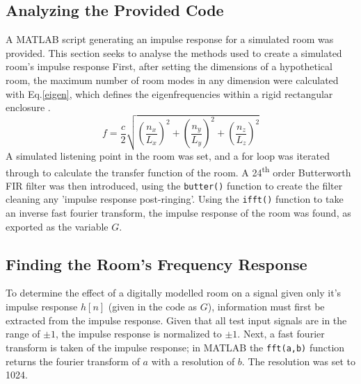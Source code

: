 \documentclass[conference]{IEEEtran}
\def\code#1{\texttt{#1}}
\begin{document}
    \subsection{Analyzing the Provided Code}
        A MATLAB script generating an impulse response for a simulated room was provided.
        This section seeks to analyse the methods used to create a simulated room's impulse response
        First, after setting the dimensions of a hypothetical room, the maximum number of room modes in any dimension were calculated with Eq.\ref{eigen}, which defines the eigenfrequencies within a rigid rectangular enclosure \cite{Cox}.
        \begin{equation}\label{eigen}
            f = \frac{c}{2}\sqrt{(\frac{n_x}{L_x})^2+(\frac{n_y}{L_y})^2+(\frac{n_z}{L_z})^2}
        \end{equation}
        A simulated listening point in the room was set, and a for loop was iterated through to calculate the transfer function of the room.
        A 24\textsuperscript{th} order Butterworth FIR filter was then introduced, using the \code{butter()} function to create the filter cleaning any 'impulse response post-ringing'.
        Using the \code{ifft()} function to take an inverse fast fourier transform, the impulse response of the room was found, as exported as the variable $G$.
    
    \subsection{Finding the Room's Frequency Response}
        To determine the effect of a digitally modelled room on a signal given only it's impulse response $h[n]$ (given in the code as $G$), information must first be extracted from the impulse response.
        Given that all test input signals are in the range of $\pm1$, the impulse response is normalized to $\pm1$.
        Next, a fast fourier transform is taken of the impulse response; in MATLAB the \code{fft(a,b)} function returns the fourier transform of $a$ with a resolution of $b$.
        The resolution was set to 1024.
\end{document}
